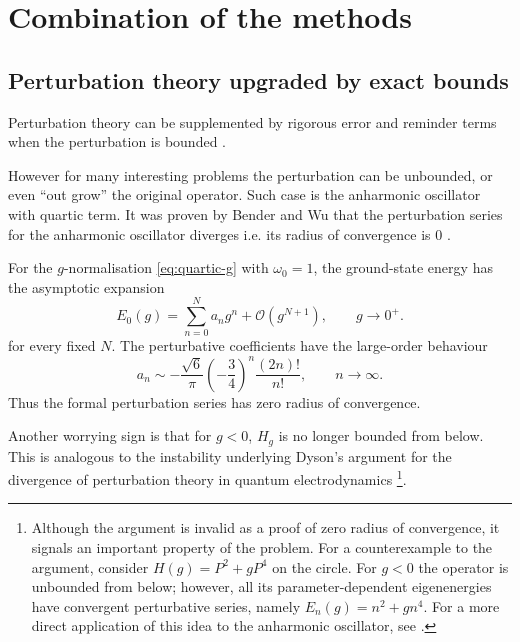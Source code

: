 \documentclass{article}
\theoremstyle{definition}
\begin{document}
\section{Combination of the methods}

\subsection{Perturbation theory upgraded by exact bounds}

Perturbation theory can be supplemented by rigorous error and reminder terms when the perturbation is bounded \cite{book:Kato1995PerturbationTheory}.

However for many interesting problems the perturbation can be unbounded, or even ``out grow'' the original operator. Such case is the anharmonic oscillator with quartic term. It was proven by Bender and Wu that the perturbation series for the anharmonic oscillator diverges i.e. its radius of convergence is 0 \cite{paper:BenderWu1969AnharmonicOscillator,paper:BenderWu1971LargeOrder}.

For the $g$-normalisation \eqref{eq:quartic-g} with $\omega_0=1$,
the ground-state energy has the asymptotic expansion
\begin{equation}
    E_0(g)
    =
    \sum_{n=0}^{N} a_n g^n
    +
    \mathcal{O}\!\left(g^{N+1}\right),
    \qquad g\to0^+ .
\end{equation}
for every fixed $N$. The perturbative coefficients have the
large-order behaviour
\begin{equation}
    a_n
    \sim
    -\frac{\sqrt{6}}{\pi}
    \left(-\frac{3}{4}\right)^n
    \frac{(2n)!}{n!},
    \qquad n\to\infty .
\end{equation}
Thus the formal perturbation series has zero radius of convergence.

Another worrying sign is that for $g<0$, $H_g$ is no longer bounded
from below. This is analogous to the instability underlying Dyson's
argument for the divergence of perturbation theory in quantum
electrodynamics \cite{paper:Dyson1952Divergence}\footnote{Although the argument is invalid as a proof of zero radius
of convergence, it signals an important property of the problem. For a
counterexample to the argument, consider $H(g)=P^2+gP^4$ on the circle.
For $g<0$ the operator is unbounded from below; however, all its
parameter-dependent eigenenergies have convergent perturbative series,
namely $E_n(g)=n^2+g n^4$. For a more direct application of this idea to the anharmonic oscillator,
see \cite{paper:HallidaySuranyi1980AnharmonicOscillator}.}\cite{paper:Schuetzhold2001Phi4Vacuum,paper:Bender2007NonHermitian}.
\end{document}
